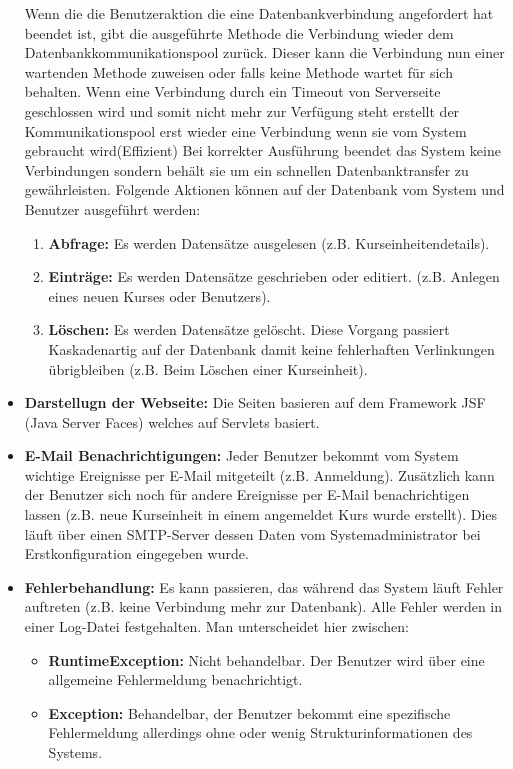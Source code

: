 \begin{itemize}
\begin{enumerate}
			\end{enumerate}
			Wenn die die Benutzeraktion die eine Datenbankverbindung angefordert hat beendet ist, gibt die ausgeführte Methode die Verbindung wieder dem Datenbankkommunikationspool zurück. Dieser kann die Verbindung nun einer wartenden Methode zuweisen oder falls keine Methode wartet für sich behalten. Wenn eine Verbindung durch ein Timeout von Serverseite geschlossen wird und somit nicht mehr zur Verfügung steht erstellt der Kommunikationspool erst wieder eine Verbindung wenn sie vom System gebraucht wird(Effizient) Bei korrekter Ausführung beendet das System keine Verbindungen sondern behält sie um ein schnellen Datenbanktransfer zu gewährleisten. Folgende Aktionen können auf der Datenbank vom System und Benutzer ausgeführt werden:
			\begin{enumerate}
				\item \textbf{Abfrage:} 
				Es werden Datensätze ausgelesen (z.B. Kurseinheitendetails).
				\item \textbf{Einträge:}
				 Es werden Datensätze geschrieben oder editiert. (z.B. Anlegen eines neuen Kurses oder Benutzers).
				\item \textbf{Löschen:} 
				Es werden Datensätze gelöscht. Diese Vorgang passiert Kaskadenartig auf der Datenbank damit keine fehlerhaften Verlinkungen übrigbleiben (z.B. Beim Löschen einer Kurseinheit).
				
			\end{enumerate}
			
			\item \textbf{Darstellugn der Webseite:} 
			Die Seiten basieren auf dem Framework JSF (Java Server Faces) welches auf Servlets basiert. 
			
			\item \textbf{E-Mail Benachrichtigungen:} Jeder Benutzer bekommt vom System wichtige Ereignisse per E-Mail mitgeteilt (z.B. Anmeldung). Zusätzlich kann der Benutzer sich noch für andere Ereignisse per E-Mail benachrichtigen lassen (z.B. neue Kurseinheit in einem angemeldet Kurs wurde erstellt). Dies läuft über einen SMTP-Server dessen Daten vom Systemadministrator bei Erstkonfiguration eingegeben wurde.
			
			\item \textbf{Fehlerbehandlung:} 
			Es kann passieren, das während das System läuft Fehler auftreten (z.B. keine Verbindung mehr zur Datenbank). Alle Fehler werden in einer Log-Datei festgehalten. Man unterscheidet hier zwischen:
			\begin{itemize}
				\item \textbf{RuntimeException:} Nicht behandelbar. Der Benutzer wird über eine allgemeine Fehlermeldung benachrichtigt.
				\item \textbf{Exception:} Behandelbar, der Benutzer bekommt eine spezifische Fehlermeldung allerdings ohne oder wenig Strukturinformationen des Systems.
				\end{itemize}
				

\end{itemize}
